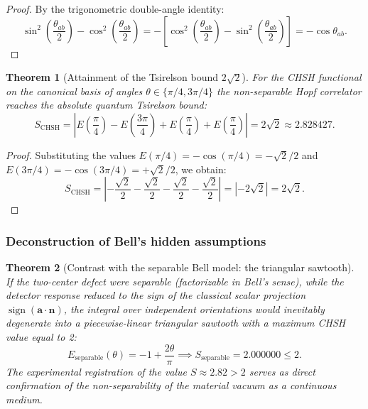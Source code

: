 \documentclass[11pt,a4paper]{article}
\newtheorem{theorem}{Theorem}
\theoremstyle{definition}
\theoremstyle{remark}
\begin{document}
\begin{proof}
By the trigonometric double-angle identity:
\begin{equation}
\sin^2\left(\frac{\theta_{ab}}{2}\right) - \cos^2\left(\frac{\theta_{ab}}{2}\right) = -\left[\cos^2\left(\frac{\theta_{ab}}{2}\right) - \sin^2\left(\frac{\theta_{ab}}{2}\right)\right] = -\cos\theta_{ab}.
\end{equation}
\end{proof}

\begin{theorem}[Attainment of the Tsirelson bound $2\sqrt{2}$]\cite{Tsirelson1980}
\label{thm:tsirelson_bound_exact_proof}
For the CHSH functional on the canonical basis of angles $\theta \in \{\pi/4, 3\pi/4\}$ the non-separable Hopf correlator reaches the absolute quantum Tsirelson bound:
\begin{equation}
S_{\mathrm{CHSH}} = \left| E\left(\frac{\pi}{4}\right) - E\left(\frac{3\pi}{4}\right) + E\left(\frac{\pi}{4}\right) + E\left(\frac{\pi}{4}\right) \right| = 2\sqrt{2} \approx 2.828427.
\label{eq:tsirelson_bound_exact_value}
\end{equation}
\end{theorem}
\begin{proof}
    Substituting the values $E(\pi/4) = -\cos(\pi/4) = -\sqrt{2}/2$ and $E(3\pi/4) = -\cos(3\pi/4) = +\sqrt{2}/2$, we obtain:
\begin{equation}
     S_{\mathrm{CHSH}} = \left| -\frac{\sqrt{2}}{2} - \frac{\sqrt{2}}{2} - \frac{\sqrt{2}}{2} - \frac{\sqrt{2}}{2} \right| = |-2\sqrt{2}| = 2\sqrt{2}.
\end{equation}
\end{proof}

\subsubsection{Deconstruction of Bell's hidden assumptions}

\begin{theorem}[Contrast with the separable Bell model: the triangular sawtooth]
\label{thm:classical_bell_comparison}
    If the two-center defect were separable (factorizable in Bell's sense), while the detector response reduced to the sign of the classical scalar projection $\operatorname{sign}(\mathbf{a} \cdot \mathbf{n})$, the integral over independent orientations would inevitably degenerate into a piecewise-linear triangular sawtooth with a maximum CHSH value equal to 2:
\begin{equation}
    E_{\mathrm{separable}}(\theta) = -1 + \frac{2\theta}{\pi} \implies S_{\mathrm{separable}} = 2.000000 \le 2.
    \label{eq:bell_classical_sawtooth}
\end{equation}
    The experimental registration of the value $S \approx 2.82 > 2$ serves as direct confirmation of the non-separability of the material vacuum as a continuous medium.
\end{theorem}
\end{document}
